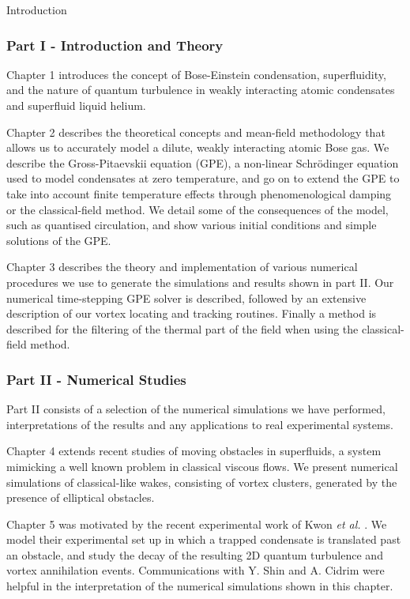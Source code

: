\begin{chapter}{\label{cha:bose_gases}Introduction}
\subsubsection{Part I - Introduction and Theory}
Chapter 1 introduces the concept of Bose-Einstein condensation, superfluidity, and the nature of quantum turbulence in weakly interacting atomic condensates and superfluid liquid helium.

Chapter 2 describes the theoretical concepts and mean-field methodology that allows us to accurately model a dilute, weakly interacting atomic Bose gas. We describe the Gross-Pitaevskii equation (GPE), a non-linear Schr\"odinger equation used to model condensates at zero temperature, and go on to extend the GPE to take into account finite temperature effects through phenomenological damping or the classical-field method. We detail some of the consequences of the model, such as quantised circulation, and show various initial conditions and simple solutions of the GPE.

Chapter 3 describes the theory and implementation of various numerical procedures we use to generate the simulations and results shown in part II. Our numerical time-stepping GPE solver is described, followed by an extensive description of our vortex locating and tracking routines. Finally a method is described for the filtering of the thermal part of the field when using the classical-field method.

\subsubsection{Part II - Numerical Studies}
Part II consists of a selection of the numerical simulations we have performed, interpretations of the results and any applications to real experimental systems.

Chapter 4 extends recent studies of moving obstacles in superfluids, a system mimicking a well known problem in classical viscous flows. We present numerical simulations of classical-like wakes, consisting of vortex clusters, generated by the presence of elliptical obstacles.

Chapter 5 was motivated by the recent experimental work of Kwon {\it et al.} \cite{kwon_moon_14}. We model their experimental set up in which a trapped condensate is translated past an obstacle, and study the decay of the resulting 2D quantum turbulence and vortex annihilation events. Communications with Y. Shin and A. Cidrim were helpful in the interpretation of the numerical simulations shown in this chapter.


\end{chapter}
